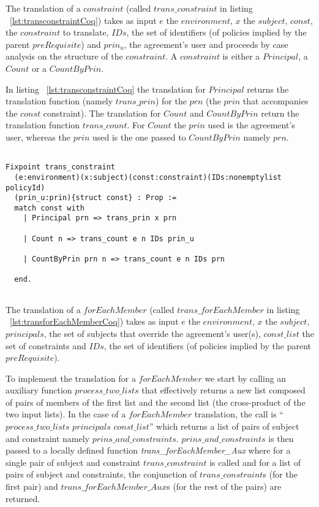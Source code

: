 The translation of a $constraint$ (called $trans\_constraint$ in listing ~\ref{lst:transconstraintCoq}) takes as input $e$ the $environment$, $x$ the $subject$, $const$, the $constraint$ to translate, $IDs$, the set of identifiers (of policies implied by the parent $preRequisite$) and $prin_{u}$, the agreement's user and proceeds by case analysis on the structure of the $constraint$. A $constraint$ is either a $Principal$, a $Count$ or a $CountByPrin$.

In listing ~\ref{lst:transconstraintCoq} the translation for $Principal$ returns the translation function (namely $trans\_prin$) for the $prn$ (the $prin$ that accompanies the $const$ constraint). The translation for $Count$ and $CountByPrin$ return the translation function $trans\_count$. For $Count$ the $prin$ used is the agreement's user, whereas the $prin$ used is the one passed to $CountByPrin$ namely $prn$.


\begin{lstlisting}

Fixpoint trans_constraint 
  (e:environment)(x:subject)(const:constraint)(IDs:nonemptylist policyId)
  (prin_u:prin){struct const} : Prop := 
  match const with
    | Principal prn => trans_prin x prn
  
    | Count n => trans_count e n IDs prin_u 

    | CountByPrin prn n => trans_count e n IDs prn 

  end.
  
\end{lstlisting}

The translation of a $forEachMember$ (called $trans\_forEachMember$ in listing ~\ref{lst:transforEachMemberCoq}) takes as input $e$ the $environment$, $x$ the $subject$, $principals$, the set of subjects that override the agreement's user(s), $const\_list$ the set of constraints and $IDs$, the set of identifiers (of policies implied by the parent $preRequisite$).

To implement the translation for a $forEachMember$ we start by calling an auxiliary function $process\_two\_lists$ that effectively returns a new list composed of pairs of members of the first list and the second list (the cross-product of the two input lists). In the case of a $forEachMember$ translation, the call is ``$process\_two\_lists$ $principals$ $const\_list$'' which returns a list of pairs of subject and constraint namely $prins\_and\_constraints$. $prins\_and\_constraints$ is then passed to a locally defined function \emph{ trans_forEachMember_Aux} where for a single pair of subject and constraint $trans\_constraint$ is called and for a list of pairs of subject and constraints, the conjunction of $trans\_constraint$s (for the first pair) and $trans\_forEachMember\_Aux$s (for the rest of the pairs) are returned.



